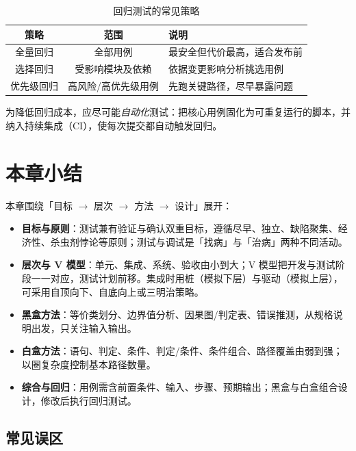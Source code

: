 \begin{table}[H]
\centering
\caption{回归测试的常见策略}
\label{tab:regression}
\begin{tabulary}{\textwidth}{CCL}
\toprule
策略 & 范围 & 说明 \\
\midrule
全量回归 & 全部用例 & 最安全但代价最高，适合发布前 \\
选择回归 & 受影响模块及依赖 & 依据变更影响分析挑选用例 \\
优先级回归 & 高风险/高优先级用例 & 先跑关键路径，尽早暴露问题 \\
\bottomrule
\end{tabulary}
\end{table}

为降低回归成本，应尽可能\emph{自动化}测试：把核心用例固化为可重复运行的脚本，并纳入持续集成（CI），使每次提交都自动触发回归。

\section{本章小结}

本章围绕「目标 $\to$ 层次 $\to$ 方法 $\to$ 设计」展开：

\begin{itemize}
    \item \textbf{目标与原则}：测试兼有验证与确认双重目标，遵循尽早、独立、缺陷聚集、经济性、杀虫剂悖论等原则；测试与调试是「找病」与「治病」两种不同活动。
    \item \textbf{层次与 V 模型}：单元、集成、系统、验收由小到大；V 模型把开发与测试阶段一一对应，测试计划前移。集成时用桩（模拟下层）与驱动（模拟上层），可采用自顶向下、自底向上或三明治策略。
    \item \textbf{黑盒方法}：等价类划分、边界值分析、因果图/判定表、错误推测，从规格说明出发，只关注输入输出。
    \item \textbf{白盒方法}：语句、判定、条件、判定/条件、条件组合、路径覆盖由弱到强；以圈复杂度控制基本路径数量。
    \item \textbf{综合与回归}：用例需含前置条件、输入、步骤、预期输出；黑盒与白盒组合设计，修改后执行回归测试。
\end{itemize}

\subsection*{常见误区}

